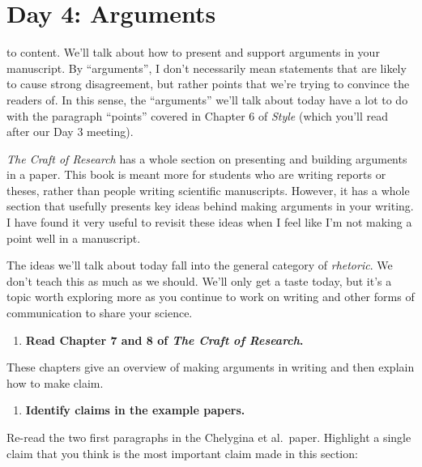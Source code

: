 \documentclass[]{tufte-book}
\providecommand{\tightlist}{%
  \setlength{\itemsep}{0pt}\setlength{\parskip}{0pt}}
\begin{document}
\hypertarget{day-4-arguments}{%
\chapter{Day 4: Arguments}\label{day-4-arguments}}

 to content. We'll talk about how to
present and support arguments in your manuscript. By ``arguments'', I don't
necessarily mean statements that are likely to cause strong disagreement, but
rather points that we're trying to convince the readers of. In this sense, the
``arguments'' we'll talk about today have a lot to do with the paragraph ``points''
covered in Chapter 6 of \emph{Style} (which you'll read after our Day 3 meeting).

\emph{The Craft of Research} has a whole section on presenting and building arguments
in a paper. This book is meant more for students who are writing reports or
theses, rather than people writing scientific manuscripts. However, it has a
whole section that usefully presents key ideas behind making arguments in your
writing. I have found it very useful to revisit these ideas when I feel like I'm
not making a point well in a manuscript.

The ideas we'll talk about today fall into the general category of \emph{rhetoric}.
We don't teach this as much as we should. We'll only get a taste today, but it's
a topic worth exploring more as you continue to work on writing and other forms
of communication to share your science.

\begin{enumerate}
\def\labelenumi{\arabic{enumi}.}
\tightlist
\item
  \textbf{Read Chapter 7 and 8 of \emph{The Craft of Research}.}
\end{enumerate}

These chapters give an overview of making arguments in writing and then
explain how to make claim.

\begin{enumerate}
\def\labelenumi{\arabic{enumi}.}
\setcounter{enumi}{1}
\tightlist
\item
  \textbf{Identify claims in the example papers.}
\end{enumerate}

Re-read the two first paragraphs in the Chelygina et al.~paper. Highlight
a single claim that you think is the most important claim made in this
section:
\end{document}
